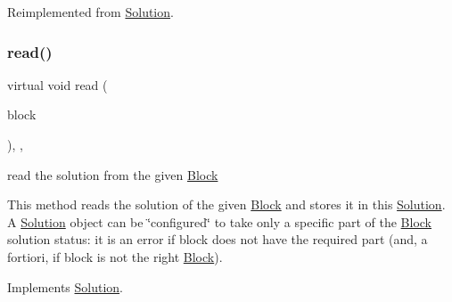 Reimplemented from \mbox{\hyperlink{class_s_m_spp__di__unipi__it_1_1_solution_a2e7b9c9148a98c5c342e8c25cac95926}{Solution}}.

\mbox{\label{class_s_m_spp__di__unipi__it_1_1_m_c_f_solution_a4feeb8f2f46fde71030bd3d8070cd90d}} 
\subsubsection{\texorpdfstring{read()}{read()}}
{\footnotesize\ttfamily virtual void read (\begin{DoxyParamCaption}\item[{const \mbox{\hyperlink{class_s_m_spp__di__unipi__it_1_1_block}{Block}} $\ast$const}]{block }\end{DoxyParamCaption})\hspace{0.3cm}{\ttfamily [final]}, {\ttfamily [override]}, {\ttfamily [virtual]}}



read the solution from the given \mbox{\hyperlink{class_s_m_spp__di__unipi__it_1_1_block}{Block}} 

This method reads the solution of the given \mbox{\hyperlink{class_s_m_spp__di__unipi__it_1_1_block}{Block}} and stores it in this \mbox{\hyperlink{class_s_m_spp__di__unipi__it_1_1_solution}{Solution}}. A \mbox{\hyperlink{class_s_m_spp__di__unipi__it_1_1_solution}{Solution}} object can be \char`\"{}configured\char`\"{} to take only a specific part of the \mbox{\hyperlink{class_s_m_spp__di__unipi__it_1_1_block}{Block}} solution status\+: it is an error if block does not have the required part (and, a fortiori, if block is not the right \mbox{\hyperlink{class_s_m_spp__di__unipi__it_1_1_block}{Block}}). 

Implements \mbox{\hyperlink{class_s_m_spp__di__unipi__it_1_1_solution_ae22668fc6d3d5794e6a881953898aa6b}{Solution}}.

\mbox{\label{class_s_m_spp__di__unipi__it_1_1_m_c_f_solution_a2c818cbb6d8b22f839a7f7336f6b382b}} 
